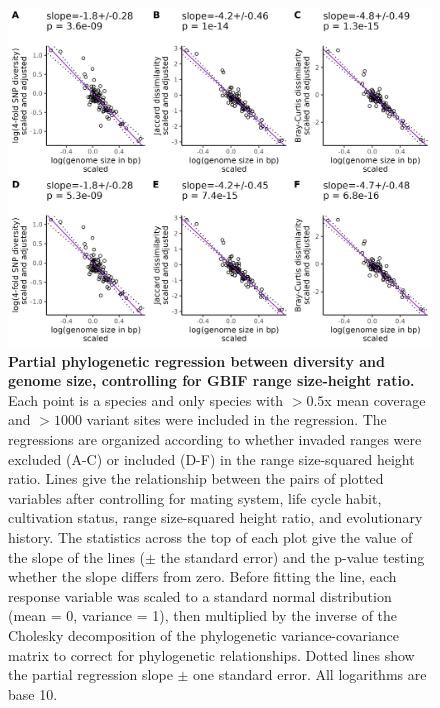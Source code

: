\documentclass[12pt]{article}
\begin{document}
\begin{figure}[H]
    \centering
    \includegraphics[width=\textwidth]{figures/appendix_d/gbif_popsize_vs_genome_size_corrected_2024-12-12.jpg}
    \caption{\textbf{Partial phylogenetic regression between diversity and genome size, controlling for GBIF range size-height ratio.} Each point is a species and only species with $>0.5$x mean coverage and $>1000$ variant sites were included in the regression. The regressions are organized according to whether invaded ranges were excluded (A-C) or included (D-F) in the range size-squared height ratio. Lines give the relationship between the pairs of plotted variables after controlling for mating system, life cycle habit, cultivation status, range size-squared height ratio, and evolutionary history. The statistics across the top of each plot give the value of the slope of the lines ($\pm$ the standard error) and the p-value testing whether the slope differs from zero. Before fitting the line, each response variable was scaled to a standard normal distribution (mean = 0, variance = 1), then multiplied by the inverse of the Cholesky decomposition of the phylogenetic variance-covariance matrix to correct for phylogenetic relationships. Dotted lines show the partial regression slope $\pm$ one standard error. All logarithms are base 10.}
\end{figure}
\end{document}
